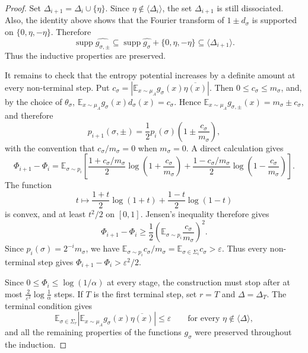 \documentclass[10pt,a4paper]{amsart}
\begin{document}
\begin{proof}
Set $\Delta_{i+1}=\Delta_i\cup\{\eta\}$. Since
$\eta\notin\langle\Delta_i\rangle$, the set $\Delta_{i+1}$ is still
dissociated. Also, the identity above shows that the Fourier transform of
$1\pm d_\sigma$ is supported on $\{0,\eta,-\eta\}$. Therefore
$$
\operatorname{supp}\widehat{g_{\sigma,\pm}}
\subseteq
\operatorname{supp}\widehat{g_\sigma}+\{0,\eta,-\eta\}
\subseteq
\langle\Delta_{i+1}\rangle.
$$
Thus the inductive properties are preserved.

It remains to check that the entropy potential increases by a definite amount
at every non-terminal step. Put
$
c_\sigma=
\left|
\mathbb E_{x\sim\mu_A}g_\sigma(x)\overline{\eta(x)}
\right|.
$
Then $0\le c_\sigma\le m_\sigma$, and, by the choice of $\theta_\sigma$,
$\mathbb E_{x\sim\mu_A}g_\sigma(x)d_\sigma(x)=c_\sigma$. Hence
$\mathbb E_{x\sim\mu_A}g_{\sigma,\pm}(x)=m_\sigma\pm c_\sigma$, and therefore
$$
p_{i+1}(\sigma,\pm)
=
\frac12 p_i(\sigma)
\left(1\pm\frac{c_\sigma}{m_\sigma}\right),
$$
with the convention that $c_\sigma/m_\sigma=0$ when $m_\sigma=0$. A direct
calculation gives
$$
\Phi_{i+1}-\Phi_i
=
\mathbb E_{\sigma\sim p_i}
\left[
\frac{1+c_\sigma/m_\sigma}{2}
\log\left(1+\frac{c_\sigma}{m_\sigma}\right)
+
\frac{1-c_\sigma/m_\sigma}{2}
\log\left(1-\frac{c_\sigma}{m_\sigma}\right)
\right].
$$
The function
$$
t\mapsto
\frac{1+t}{2}\log(1+t)
+
\frac{1-t}{2}\log(1-t)
$$
is convex, and at least $t^2/2$ on $[0,1]$. Jensen's
inequality therefore gives
$$
\Phi_{i+1}-\Phi_i
\ge
\frac12
\left(
\mathbb E_{\sigma\sim p_i}\frac{c_\sigma}{m_\sigma}
\right)^2.
$$
Since $p_i(\sigma)=2^{-i}m_\sigma$, we have
$\mathbb E_{\sigma\sim p_i}c_\sigma/m_\sigma
=
\mathbb E_{\sigma\in\Sigma_i}c_\sigma>\varepsilon$. Thus every non-terminal
step gives $\Phi_{i+1}-\Phi_i>\varepsilon^2/2$.

Since $0\le \Phi_i\le \log(1/\alpha)$ at every stage, the construction must
stop after at most
$
\frac{2}{\varepsilon^2}\log\frac1\alpha
$
steps. If $T$ is the first terminal step, set $r=T$ and
$\Delta=\Delta_T$. The terminal condition gives
$$
\mathbb E_{\sigma\in\Sigma_r}
\left|
\mathbb E_{x\sim\mu_A}g_\sigma(x)\overline{\eta(x)}
\right|
\le \varepsilon
\qquad\text{for every }\eta\notin\langle\Delta\rangle,
$$
and all the remaining properties of the functions $g_\sigma$ were preserved
throughout the induction.
\end{proof}
\end{document}
